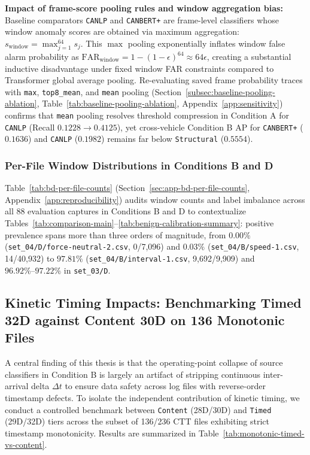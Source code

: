 \documentclass[12pt, a4paper, reqno, oneside]{book}
\DeclareRobustCommand{\code}[1]{\nolinkurl{#1}}
\begin{document}
\noindent\textbf{Impact of frame-score pooling rules and window aggregation bias:} Baseline comparators \code{CANLP} and \code{CANBERT+} are frame-level classifiers whose window anomaly scores are obtained via maximum aggregation: $s_{\text{window}} = \max_{j=1}^{64} s_j$. This $\max$ pooling exponentially inflates window false alarm probability as $\text{FAR}_{\text{window}} = 1 - (1 - \epsilon)^{64} \approx 64\epsilon$, creating a substantial inductive disadvantage under fixed window FAR constraints compared to Transformer global average pooling. Re-evaluating saved frame probability traces with \code{max}, \code{top8\_mean}, and \code{mean} pooling (Section~\ref{subsec:baseline-pooling-ablation}, Table~\ref{tab:baseline-pooling-ablation}, Appendix~\ref{app:sensitivity}) confirms that \code{mean} pooling resolves threshold compression in Condition A for \code{CANLP} (Recall $0.1228 \to 0.4125$), yet cross-vehicle Condition B AP for \code{CANBERT+} ($0.1636$) and \code{CANLP} ($0.1982$) remains far below \code{Structural} ($0.5554$).

\subsubsection{Per-File Window Distributions in Conditions B and D}\label{subsec:bd-per-file-counts}
Table~\ref{tab:bd-per-file-counts} (Section~\ref{sec:app-bd-per-file-counts}, Appendix~\ref{app:reproducibility}) audits window counts and label imbalance across all 88 evaluation captures in Conditions B and D to contextualize Tables~\ref{tab:comparison-main}--\ref{tab:benign-calibration-summary}: positive prevalence spans more than three orders of magnitude, from $0.00\%$ (\code{set\_04/D/force-neutral-2.csv}, 0/7,096) and $0.03\%$ (\code{set\_04/B/speed-1.csv}, 14/40,932) to $97.81\%$ (\code{set\_04/B/interval-1.csv}, 9,692/9,909) and $96.92\%\text{--}97.22\%$ in \code{set\_03/D}.

\subsection{Kinetic Timing Impacts: Benchmarking Timed 32D against Content 30D on 136 Monotonic Files}\label{subsec:timed-vs-content}
A central finding of this thesis is that the operating-point collapse of source classifiers in Condition B is largely an artifact of stripping continuous inter-arrival delta $\Delta t$ to ensure data safety across log files with reverse-order timestamp defects. To isolate the independent contribution of kinetic timing, we conduct a controlled benchmark between \code{Content} (28D/30D) and \code{Timed} (29D/32D) tiers across the subset of 136/236 CTT files exhibiting strict timestamp monotonicity. Results are summarized in Table~\ref{tab:monotonic-timed-vs-content}.
\end{document}
